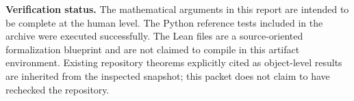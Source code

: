 \documentclass[11pt,oneside]{article}
\theoremstyle{remark}
\begin{document}
\vspace{0.5em}
\noindent\textbf{Verification status.}
The mathematical arguments in this report are intended to be complete at the human level.  The Python reference tests included in the archive were executed successfully.  The Lean files are a source-oriented formalization blueprint and are not claimed to compile in this artifact environment.  Existing repository theorems explicitly cited as object-level results are inherited from the inspected snapshot; this packet does not claim to have rechecked the repository.

\tableofcontents
\newpage

















\end{document}
